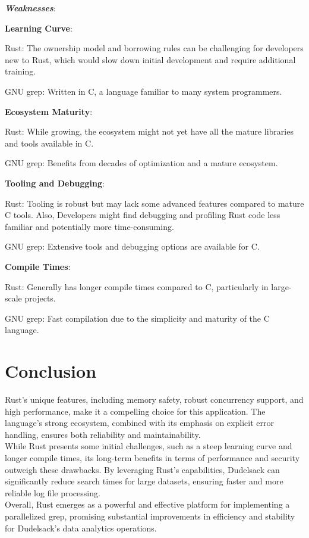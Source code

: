 \documentclass[letterpaper,twocolumn,10pt]{article}
\begin{document}
{\it{\textbf{Weaknesses}}}:

\noindent \textbf{Learning Curve}:

Rust: The ownership model and borrowing rules can be challenging for developers new to Rust, which would slow down initial development and require additional training.

GNU grep: Written in C, a language familiar to many system programmers.

\noindent \textbf{Ecosystem Maturity}:

Rust: While growing, the ecosystem might not yet have all the mature libraries and tools available in C.

GNU grep: Benefits from decades of optimization and a mature ecosystem.

\noindent \textbf{Tooling and Debugging}:

Rust: Tooling is robust but may lack some advanced features compared to mature C tools. Also, Developers might find debugging and profiling Rust code less familiar and potentially more time-consuming.

GNU grep: Extensive tools and debugging options are available for C.

\noindent \textbf{Compile Times}:

Rust: Generally has longer compile times compared to C, particularly in large-scale projects.

GNU grep: Fast compilation due to the simplicity and maturity of the C language.

\section{Conclusion}
\noindent Rust’s unique features, including memory safety, robust concurrency support, and high performance, make it a compelling choice for this application. The language’s strong ecosystem, combined with its emphasis on explicit error handling, ensures both reliability and maintainability.\\

\noindent While Rust presents some initial challenges, such as a steep learning curve and longer compile times, its long-term benefits in terms of performance and security outweigh these drawbacks. By leveraging Rust’s capabilities, Dudelsack can significantly reduce search times for large datasets, ensuring faster and more reliable log file processing.\\

\noindent Overall, Rust emerges as a powerful and effective platform for implementing a parallelized grep, promising substantial improvements in efficiency and stability for Dudelsack’s data analytics operations.


\end{document}

